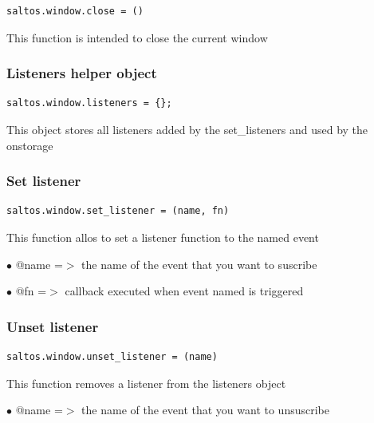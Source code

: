\documentclass[a4paper]{article}
\begin{document}
\begin{lstlisting}
saltos.window.close = ()
\end{lstlisting}

This function is intended to close the current window

\hypertarget{toc307}{}
\subsubsection{Listeners helper object}

\begin{lstlisting}
saltos.window.listeners = {};
\end{lstlisting}

This object stores all listeners added by the set\_listeners and used by the onstorage

\hypertarget{toc308}{}
\subsubsection{Set listener}

\begin{lstlisting}
saltos.window.set_listener = (name, fn)
\end{lstlisting}

This function allos to set a listener function to the named event

\begin{compactitem}
\item[\color{myblue}$\bullet$] @name =$>$ the name of the event that you want to suscribe
\item[\color{myblue}$\bullet$] @fn   =$>$ callback executed when event named is triggered
\end{compactitem}

\hypertarget{toc309}{}
\subsubsection{Unset listener}

\begin{lstlisting}
saltos.window.unset_listener = (name)
\end{lstlisting}

This function removes a listener from the listeners object

\begin{compactitem}
\item[\color{myblue}$\bullet$] @name =$>$ the name of the event that you want to unsuscribe
\end{compactitem}
\end{document}
